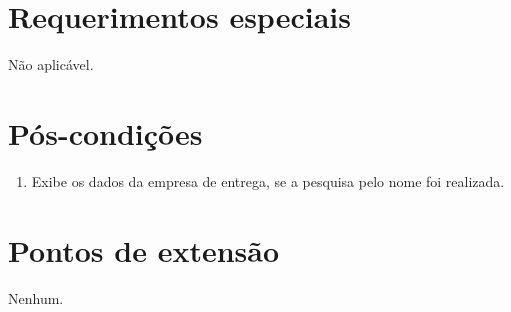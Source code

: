 \section{Requerimentos especiais}

Não aplicável.

\section{Pós-condições}

\begin{enumerate}
	\item Exibe os dados da empresa de entrega, se a pesquisa pelo nome foi realizada.
\end{enumerate}

\section{Pontos de extensão}

Nenhum.